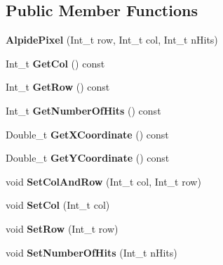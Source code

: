 \subsection*{Public Member Functions}
\begin{DoxyCompactItemize}
\item 
\mbox{\label{class_alpide_pixel_a0ead4d3c0d6dd2039573584fdfadc58e}} 
{\bfseries Alpide\+Pixel} (Int\+\_\+t row, Int\+\_\+t col, Int\+\_\+t n\+Hits)
\item 
\mbox{\label{class_alpide_pixel_a4169eb88465395230dd8771494bed982}} 
Int\+\_\+t {\bfseries Get\+Col} () const
\item 
\mbox{\label{class_alpide_pixel_acfa0e8e4238632f7395f1cf5d5870f87}} 
Int\+\_\+t {\bfseries Get\+Row} () const
\item 
\mbox{\label{class_alpide_pixel_a33c8d29096ed42e8ac5223106d850258}} 
Int\+\_\+t {\bfseries Get\+Number\+Of\+Hits} () const
\item 
\mbox{\label{class_alpide_pixel_af034dd404d83563ea4432b65121c2ffb}} 
Double\+\_\+t {\bfseries Get\+X\+Coordinate} () const
\item 
\mbox{\label{class_alpide_pixel_a9c0831870db24562a4cf3ffafa48f1ce}} 
Double\+\_\+t {\bfseries Get\+Y\+Coordinate} () const
\item 
\mbox{\label{class_alpide_pixel_ac58e1fa2fe45f8808728bfe08e83618f}} 
void {\bfseries Set\+Col\+And\+Row} (Int\+\_\+t col, Int\+\_\+t row)
\item 
\mbox{\label{class_alpide_pixel_a1d490d001379d939dd0564b135775178}} 
void {\bfseries Set\+Col} (Int\+\_\+t col)
\item 
\mbox{\label{class_alpide_pixel_a56759b535e206322d700e60796232e66}} 
void {\bfseries Set\+Row} (Int\+\_\+t row)
\item 
\mbox{\label{class_alpide_pixel_aac8f5fd8c008acf7fe5a74a82e64d959}} 
void {\bfseries Set\+Number\+Of\+Hits} (Int\+\_\+t n\+Hits)

\end{DoxyCompactItemize}
